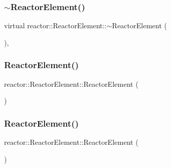 \subsubsection{\texorpdfstring{$\sim$\+Reactor\+Element()}{~ReactorElement()}}
{\footnotesize\ttfamily virtual reactor\+::\+Reactor\+Element\+::$\sim$\+Reactor\+Element (\begin{DoxyParamCaption}{ }\end{DoxyParamCaption})\hspace{0.3cm}{\ttfamily [inline]}, {\ttfamily [virtual]}}

\mbox{\label{classreactor_1_1ReactorElement_aa975574e21f5f7a4bb761f04ed57dfa4}} 
\subsubsection{\texorpdfstring{Reactor\+Element()}{ReactorElement()}\hspace{0.1cm}{\footnotesize\ttfamily [3/4]}}
{\footnotesize\ttfamily reactor\+::\+Reactor\+Element\+::\+Reactor\+Element (\begin{DoxyParamCaption}\item[{const \hyperlink{classreactor_1_1ReactorElement}{Reactor\+Element} \&}]{ }\end{DoxyParamCaption})\hspace{0.3cm}{\ttfamily [delete]}}

\mbox{\label{classreactor_1_1ReactorElement_a2ba6e1e309233db7cfc124563f9f8f9f}} 
\subsubsection{\texorpdfstring{Reactor\+Element()}{ReactorElement()}\hspace{0.1cm}{\footnotesize\ttfamily [4/4]}}
{\footnotesize\ttfamily reactor\+::\+Reactor\+Element\+::\+Reactor\+Element (\begin{DoxyParamCaption}\item[{\hyperlink{classreactor_1_1ReactorElement}{Reactor\+Element} \&\&}]{ }\end{DoxyParamCaption})\hspace{0.3cm}{\ttfamily [delete]}}



